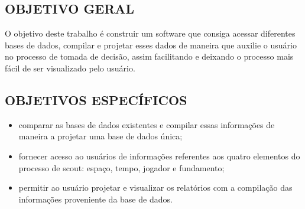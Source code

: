 \subsection{OBJETIVO GERAL}
O objetivo deste trabalho é construir um software que consiga acessar diferentes bases de dados, compilar e projetar esses dados de maneira que auxilie o usuário no processo de tomada de decisão, assim facilitando e deixando o processo mais fácil de ser visualizado pelo usuário.

\subsection{OBJETIVOS ESPECÍFICOS}
\begin{itemize}
	\item  comparar as bases de dados existentes e compilar essas informações de maneira a projetar uma base de dados única;
	\item fornecer acesso ao usuários de informações referentes aos quatro elementos do processo de scout: espaço, tempo, jogador e fundamento;
	\item permitir ao usuário projetar e visualizar os relatórios com a compilação das informações proveniente da base de dados.
\end{itemize}
